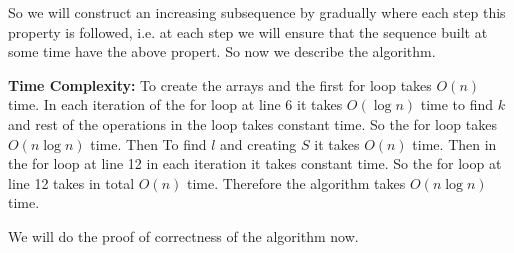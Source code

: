 So we will construct an increasing subsequence by gradually where each step this property is followed, i.e. at each step we will ensure that the sequence built at some time have the above propert. So now we describe the algorithm. 
\begin{algorithm}
	\DontPrintSemicolon
\caption{$(A)$}
\end{algorithm}\parinf

\textbf{Time Complexity:} To create the arrays and the first for loop takes $O(n)$ time. In each iteration of the for loop at line 6 it takes $O(\log n)$ time to find $k$ and rest of the operations in the loop takes constant time. So the for loop takes $O(n\log n)$ time.  Then To find $l$ and creating $S$ it takes $O(n)$ time. Then in the for loop at line 12 in each iteration it takes constant time. So the for loop at line 12 takes in total $O(n)$ time. Therefore the algorithm takes $O(n\log n)$ time. \parinn

We will do the proof of correctness of the algorithm now.



